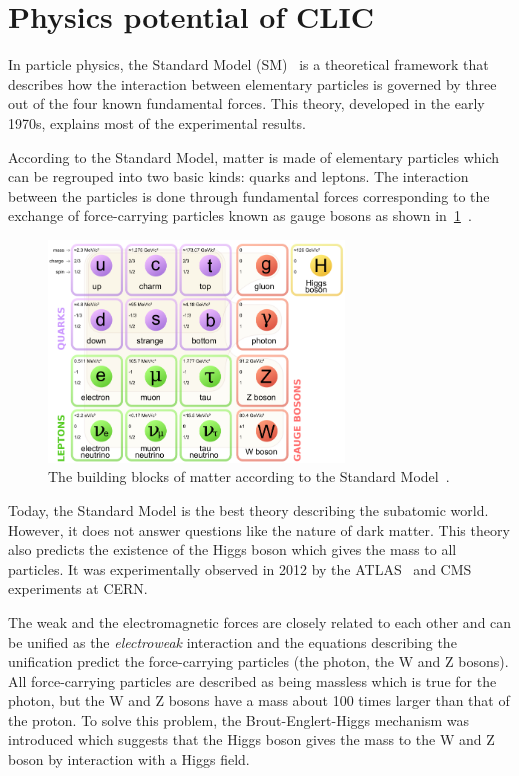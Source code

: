 \section{Physics potential of CLIC}

In particle physics, the Standard Model
(SM)~\cite{Glashow:1961tr,Weinberg:1967tq,salam,tHooft:1972tcz} is a
theoretical framework that describes how the interaction between
elementary particles is governed by three out of the four known
fundamental forces. This theory, developed in the early 1970s,
explains most of the experimental results.

According to the Standard Model, matter is made of elementary
particles which can be regrouped into two basic kinds: quarks and
leptons. The interaction between the particles is done through
fundamental forces corresponding to the exchange of force-carrying
particles known as gauge bosons as shown
in~\cref{fig:standardmodel}~\cite{Thomson:1529540}.

\begin{figure}[htbp]
  \centering
  \includegraphics[width=0.7\textwidth]{figures/CLIC/StandardModel.png}
  \caption{The building blocks of matter according to the Standard
    Model~\cite{wikipediaParticles}.}
  \label{fig:standardmodel}
\end{figure}

Today, the Standard Model is the best theory describing the subatomic
world. However, it does not answer questions like the nature of dark
matter. This theory also predicts the existence of the Higgs boson
which gives the mass to all particles. It was experimentally observed
in 2012 by the ATLAS~\cite{Aad20121} and CMS~\cite{Chatrchyan201230}
experiments at CERN.

The weak and the electromagnetic forces are closely related to each
other and can be unified as the \textit{electroweak} interaction and
the equations describing the unification predict the force-carrying
particles (the photon, the W and Z bosons). All force-carrying
particles are described as being massless which is true for the
photon, but the W and Z bosons have a mass about 100 times larger than
that of the proton. To solve this problem, the Brout-Englert-Higgs
mechanism was introduced which suggests that the Higgs boson gives the
mass to the W and Z boson by interaction with a Higgs field.


